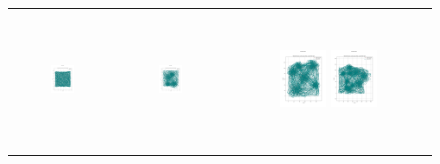 \begin{figure}[p]
\begin{tabular}{ccc}
        \includegraphics[height=36mm,width=0.24\textwidth]{Images/simulation_no_obs/dubins_path/41.png}
        & \includegraphics[height=36mm,width=0.24\textwidth]{Images/simulation_no_obs/dubins_path/42.png}
        & \includegraphics[height=36mm,width=0.24\textwidth]{Images/simulation_no_obs/dubins_path/43.png}
        \includegraphics[height=36mm,width=0.24\textwidth]{Images/simulation_no_obs/dubins_path/44.png}\\[-4pt]


\end{tabular}
\end{figure}

